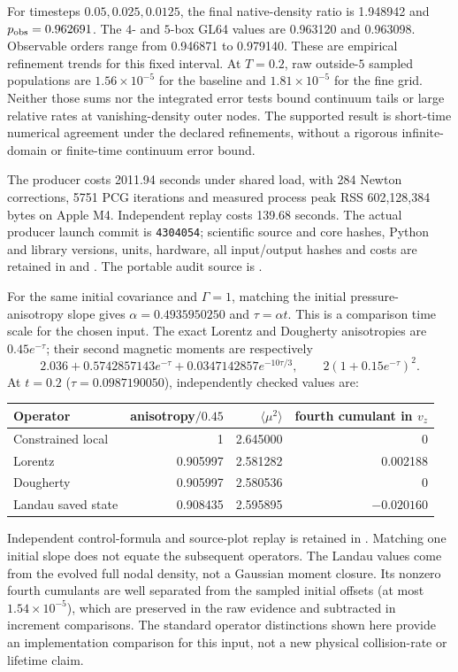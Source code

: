 \documentclass[11pt,letterpaper]{article}
\begin{document}
For timesteps $0.05,0.025,0.0125$, the final native-density ratio is
1.948942 and $p_{\rm obs}=0.962691$. The $4$- and $5$-box GL64 values
are 0.963120 and 0.963098. Observable orders range from 0.946871 to
0.979140. These are empirical refinement trends for this fixed interval.
At $T=0.2$, raw outside-$5$ sampled populations are
$1.56\times10^{-5}$ for the baseline and $1.81\times10^{-5}$ for the
fine grid. Neither those sums nor the integrated error tests bound
continuum tails or large relative rates at vanishing-density outer nodes.
The supported result is short-time numerical agreement under the declared
refinements, without a rigorous infinite-domain or finite-time continuum
error bound.

The producer costs 2011.94 seconds under shared load, with 284 Newton
corrections, 5751 PCG iterations and measured process peak RSS
602,128,384 bytes on Apple M4. Independent replay costs 139.68 seconds.
The actual producer launch commit is \texttt{4304054}; scientific
source and core hashes, Python and library versions, units, hardware,
all input/output hashes and costs are retained in
 and
.
The portable audit source is .

For the same initial covariance and $\Gamma=1$, matching the initial
pressure-anisotropy slope gives $\alpha=0.4935950250$ and
$\tau=\alpha t$. This is a comparison time scale for the chosen input.
The exact Lorentz and Dougherty anisotropies are $0.45e^{-\tau}$;
their second magnetic moments are respectively
\[
 2.036+0.5742857143e^{-\tau}+0.0347142857e^{-10\tau/3},
 \qquad 2(1+0.15e^{-\tau})^2.
\]
At $t=0.2$ ($\tau=0.0987190050$), independently checked values are:
\begin{center}
\begin{tabular}{lrrr}
\hline
Operator & anisotropy$/0.45$ & $\langle\mu^2\rangle$ & fourth cumulant in $v_z$\\
\hline
Constrained local &1&2.645000&0\\
Lorentz &0.905997&2.581282&0.002188\\
Dougherty &0.905997&2.580536&0\\
Landau saved state &0.908435&2.595895&$-0.020160$\\
\hline
\end{tabular}
\end{center}
Independent control-formula and source-plot replay is retained in
.
Matching one initial slope does not equate the subsequent operators.
The Landau values come from the evolved full nodal density, not a
Gaussian moment closure. Its nonzero fourth cumulants are well separated
from the sampled initial offsets (at most $1.54\times10^{-5}$), which
are preserved in the raw evidence and subtracted in increment comparisons.
The standard operator distinctions shown here provide an implementation
comparison for this input, not a new physical collision-rate or lifetime
claim.



\end{document}
